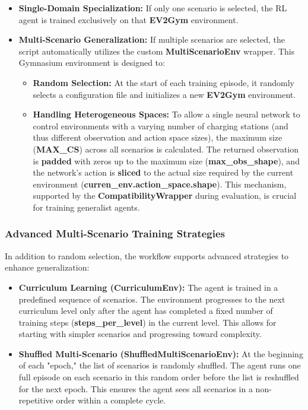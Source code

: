 \begin{itemize}
    \item \textbf{Single-Domain Specialization:} If only one scenario is selected, the RL agent is trained exclusively on that \textbf{EV2Gym} environment.
    \item \textbf{Multi-Scenario Generalization:} If multiple scenarios are selected, the script automatically utilizes the custom \textbf{MultiScenarioEnv} wrapper. This Gymnasium environment is designed to:
    \begin{itemize}
        \item \textbf{Random Selection:} At the start of each training episode, it randomly selects a configuration file and initializes a new \textbf{EV2Gym} environment.
        \item \textbf{Handling Heterogeneous Spaces:} To allow a single neural network to control environments with a varying number of charging stations (and thus different observation and action space sizes), the maximum size (\textbf{MAX\_CS}) across all scenarios is calculated. The returned observation is \textbf{padded} with zeros up to the maximum size (\textbf{max\_obs\_shape}), and the network's action is \textbf{sliced} to the actual size required by the current environment (\textbf{curren\_env.action\_space.shape}). This mechanism, supported by the \textbf{CompatibilityWrapper} during evaluation, is crucial for training generalist agents.
    \end{itemize}
\end{itemize}

\subsubsection{Advanced Multi-Scenario Training Strategies}

In addition to random selection, the workflow supports advanced strategies to enhance generalization:

\begin{itemize}
    \item \textbf{Curriculum Learning (\textbf{CurriculumEnv}):} The agent is trained in a predefined sequence of scenarios. The environment progresses to the next curriculum level only after the agent has completed a fixed number of training steps (\textbf{steps\_per\_level}) in the current level. This allows for starting with simpler scenarios and progressing toward complexity.
    \item \textbf{Shuffled Multi-Scenario (\textbf{ShuffledMultiScenarioEnv}):} At the beginning of each "epoch," the list of scenarios is randomly shuffled. The agent runs one full episode on each scenario in this random order before the list is reshuffled for the next epoch. This ensures the agent sees all scenarios in a non-repetitive order within a complete cycle.
\end{itemize}

